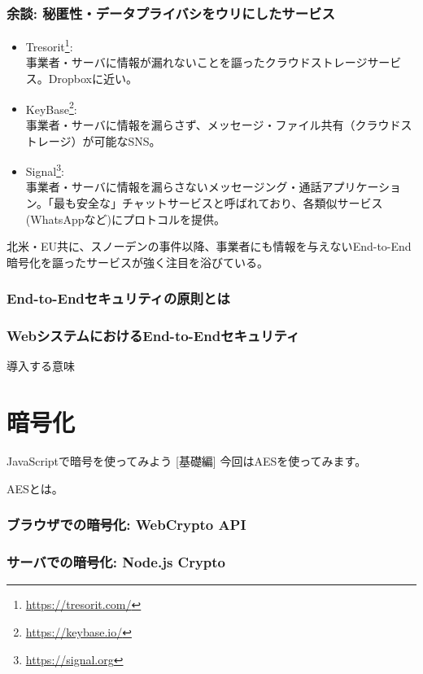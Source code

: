 \documentclass[12pt,dvipdfmx]{beamer}
\begin{document}
\begin{frame}
\frametitle{余談: 秘匿性・データプライバシをウリにしたサービス}
\small 
\begin{itemize}
\item Tresorit\footnote[frame]{\scriptsize \url{https://tresorit.com/}}:\\
事業者・サーバに情報が漏れないことを謳ったクラウドストレージサービス。Dropboxに近い。

\item KeyBase\footnote[frame]{\scriptsize \url{https://keybase.io/}}:\\
事業者・サーバに情報を漏らさず、メッセージ・ファイル共有（クラウドストレージ）が可能なSNS。

\item Signal\footnote[frame]{\scriptsize \url{https://signal.org}}:\\
事業者・サーバに情報を漏らさないメッセージング・通話アプリケーション。「最も安全な」チャットサービスと呼ばれており、各類似サービス(WhatsAppなど)にプロトコルを提供。
\end{itemize}

北米・EU共に、スノーデンの事件以降、事業者にも情報を与えない\alert{End-to-End暗号化}を謳ったサービスが強く注目を浴びている。
\end{frame}

\begin{frame}
 \frametitle{End-to-Endセキュリティの原則とは}
\end{frame}

\begin{frame}
\frametitle{WebシステムにおけるEnd-to-Endセキュリティ}
導入する意味
\end{frame}

\section{暗号化}
\begin{frame}
\centering
{\Large JavaScriptで暗号を使ってみよう [基礎編]}
今回はAESを使ってみます。

AESとは。
\end{frame}

\begin{frame}
 \frametitle{ブラウザでの暗号化: WebCrypto API}
\end{frame}

\begin{frame}
 \frametitle{サーバでの暗号化: Node.js Crypto}
\end{frame}
\end{document}
